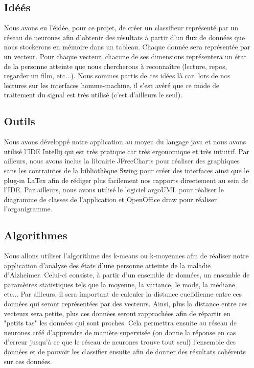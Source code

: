 		\subsection{Idéés} %
		\label{sub:idéés}
		
		Nous avons eu l'éidée, pour ce projet, de créer un classifieur représenté par un réseau de neurones afin d'obtenir des résultats à partir d'un flux de données que nous stockerons en mémoire dans un tableau. Chaque donnée sera représentée par un vecteur. Pour chaque vecteur, chacune de ses dimensions représentera un état de la personne atteinte que nous chercherons à reconnaître (lecture, repos, regarder un film, etc...). Nous sommes partis de ces idées là car, lors de nos lectures sur les interfaces homme-machine, il s'est avéré que ce mode de traitement du signal est très utilisé (c'est d'ailleurs le seul).
		
		\subsection{Outils} %
		\label{sub:outils}
		
		Nous avons développé notre application au moyen du langage java et nous avons utilisé l'IDE Intellij qui est très pratique car très ergonomique et très intuitif. Par ailleurs, nous avons inclus la librairie JFreeCharts pour réaliser des graphiques sans les contraintes de la bibliothèque Swing pour créer des interfaces ainsi que le plug-in LaTex afin de rédiger plus facilement nos rapports directement au sein de l'IDE.
		Par ailleurs, nous avons utilisé le logiciel argoUML pour réaliser le diagramme de classes de l'application et OpenOffice draw pour réaliser l'organigramme.
		
		\subsection{Algorithmes} %
		\label{sub:algorithmes}
		
		Nous allons utiliser l'algorithme des k-means ou k-moyennes afin de réaliser notre application d'analyse des états d'une personne atteinte de la maladie d'Alzheimer. Celui-ci consiste, à partir d'un ensemble de données, un ensemble de paramètres statistiques tels que la moyenne, la variance, le mode, la médiane, etc... Par ailleurs, il sera important de calculer la distance euclidienne entre ces données qui seront représentées par des vecteurs. Ainsi, plus la distance entre ces vecteurs sera petite, plus ces données seront rapprochées afin de répartir en "petits tas" les données qui sont proches. Cela permettra ensuite au réseau de neurones créé d'apprendre de manière supervisée (on donne la réponse en cas d'erreur jusqu'à ce que le réseau de neurones trouve tout seul) l'ensemble des données et de pouvoir les classifier ensuite afin de donner des résultats cohérents sur ces données. 
		
